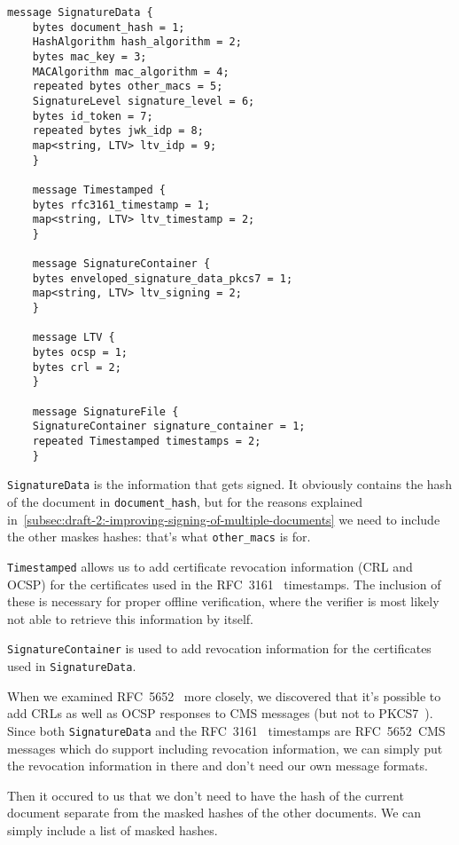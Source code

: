 \begin{lstlisting}[caption={Draft 2 schema 1}, captionpos=b, label={lst:draft2schema1}]
    message SignatureData {
    bytes document_hash = 1;
    HashAlgorithm hash_algorithm = 2;
    bytes mac_key = 3;
    MACAlgorithm mac_algorithm = 4;
    repeated bytes other_macs = 5;
    SignatureLevel signature_level = 6;
    bytes id_token = 7;
    repeated bytes jwk_idp = 8;
    map<string, LTV> ltv_idp = 9;
    }

    message Timestamped {
    bytes rfc3161_timestamp = 1;
    map<string, LTV> ltv_timestamp = 2;
    }

    message SignatureContainer {
    bytes enveloped_signature_data_pkcs7 = 1;
    map<string, LTV> ltv_signing = 2;
    }

    message LTV {
    bytes ocsp = 1;
    bytes crl = 2;
    }

    message SignatureFile {
    SignatureContainer signature_container = 1;
    repeated Timestamped timestamps = 2;
    }
\end{lstlisting}

\texttt{SignatureData} is the information that gets signed.
It obviously contains the hash of the document in \texttt{document\_hash},
but for the reasons explained in~\ref{subsec:draft-2:-improving-signing-of-multiple-documents}
we need to include the other maskes hashes: that's what \texttt{other\_macs} is for.

\texttt{Timestamped} allows us to add certificate revocation information (\gls{CRL} and \gls{OCSP}) for the certificates used in the RFC~3161~\cite{rfc3161} timestamps.
The inclusion of these is necessary for proper offline verification, where the verifier is most likely not able to retrieve this information by itself.

\texttt{SignatureContainer} is used to add revocation information for the certificates used in \texttt{SignatureData}.

When we examined RFC~5652~\cite{rfc5652} more closely, we discovered that it's possible to add
\gls{CRL}s as well as \gls{OCSP} responses to \gls{CMS} messages (but not to \gls{PKCS7}~\cite[Section 10.2.1, RevocationInfoChoices and OtherRevocationInfoFormat]{rfc5652}).
Since both \texttt{SignatureData} and the RFC~3161~\cite{rfc3161} timestamps are RFC~5652~\gls{CMS} messages which do support including revocation information,
we can simply put the revocation information in there and don't need our own message formats.

Then it occured to us that we don't need to have the hash of the current document separate from the masked hashes of the other documents.
We can simply include a list of masked hashes.

